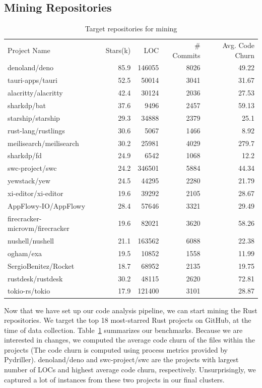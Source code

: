 \subsection{\label{sec:mining_repositories}Mining Repositories}

\begin{table}
\caption{\label{table:repos} Target repositories for mining}
\begin{tabular}{l r r r r}
    Project Name & Stars(k) & LOC & \# Commits & Avg. Code Churn \\
    denoland/deno & 85.9 & 146055 & 8026 & 49.22 \\
    tauri-apps/tauri & 52.5 & 50014 & 3041 & 31.67 \\
    alacritty/alacritty & 42.4 & 30124 & 2036 & 27.53 \\
    sharkdp/bat & 37.6 & 9496 & 2457 & 59.13 \\
    starship/starship & 29.3 & 34888 & 2379 & 25.1 \\
    rust-lang/rustlings & 30.6 & 5067 & 1466 & 8.92 \\
    meilisearch/meilisearch & 30.2 & 25981 & 4029 & 279.7 \\
    sharkdp/fd & 24.9 & 6542 & 1068 & 12.2 \\
    swc-project/swc & 24.2 & 346501 & 5884 & 44.34 \\
    yewstack/yew & 24.5 & 44295 & 2280 & 21.79 \\
    xi-editor/xi-editor & 19.6 & 39292 & 2105 & 28.67 \\
    AppFlowy-IO/AppFlowy & 28.4 & 57646 & 3321 & 29.49 \\
    firecracker-microvm/firecracker & 19.6 & 82021 & 3620 & 58.26 \\
    nushell/nushell & 21.1 & 163562 & 6088 & 22.38 \\
    ogham/exa & 19.5 & 10852 & 1558 & 11.99 \\
    SergioBenitez/Rocket & 18.7 & 68952 & 2135 & 19.75 \\
    rustdesk/rustdesk & 30.2 & 48115 & 2620 & 72.81 \\
    tokio-rs/tokio & 17.9 & 121400 & 3101 & 28.87 
\end{tabular}
\end{table}
   

Now that we have set up our code analysis pipeline, we can start mining the Rust repositories. We target the top 18 most-starred Rust projects on GitHub, at the time of data collection. Table~\ref{table:repos} summarizes our benchmarks. Because we are interested in changes, we computed the average code churn of the files within the projects (The code churn is computed using process metrics provided by Pydriller). denoland/deno and swc-project/swc are the projects with largest number of LOCs and highest average code churn, respectively. Unsurprisingly, we captured a lot of instances from these two projects in our final clusters.

